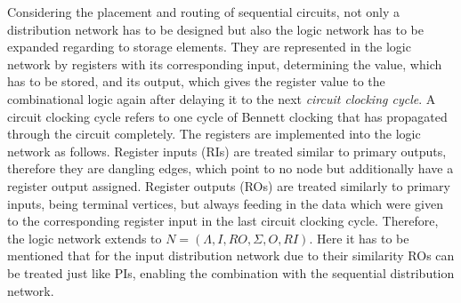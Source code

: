 Considering the placement and routing of sequential circuits, not only a distribution network has to be designed but also the logic network has to be expanded regarding to storage elements. They are represented in the logic network by registers with its corresponding input, determining the value, which has to be stored, and its output, which gives the register value to the combinational logic again after delaying it to the next \textit{circuit clocking cycle}. A circuit clocking cycle refers to one cycle of Bennett clocking that has propagated through the circuit completely. The registers are implemented into the logic network as follows. Register inputs (RIs) are treated similar to primary outputs, therefore they are dangling edges, which point to no node but additionally have a register output assigned. Register outputs (ROs) are treated similarly to primary inputs, being terminal vertices, but always feeding in the data which were given to the corresponding register input in the last circuit clocking cycle. Therefore, the logic network extends to $N = (\Lambda, I, RO, \Sigma, O, RI)$. Here it has to be mentioned that for the input distribution network due to their similarity ROs can be treated just like PIs, enabling the combination with the sequential distribution network.
